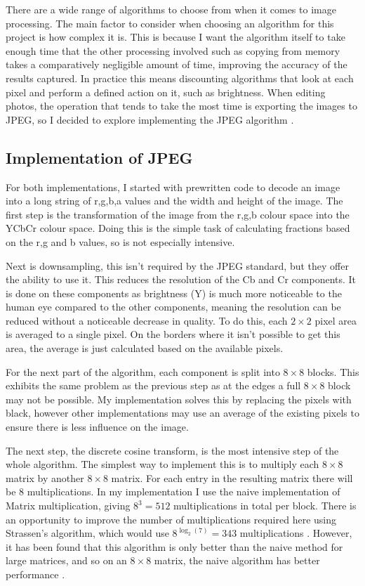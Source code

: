 \documentclass[12pt,a4paper]{article}
\begin{document}
There are a wide range of algorithms to choose from when it comes to image processing. The main factor to consider when choosing an algorithm for this project is how complex it is. This is because I want the algorithm itself to take enough time that the other processing involved such as copying from memory takes a comparatively negligible amount of time, improving the accuracy of the results captured. In practice this means discounting algorithms that look at each pixel and perform a defined action on it, such as brightness. When editing photos, the operation that tends to take the most time is exporting the images to JPEG, so I decided to explore implementing the JPEG algorithm \cite{jpeg}.

\subsection{Implementation of JPEG}

For both implementations, I started with prewritten code to decode an image into a long string of r,g,b,a values and the width and height of the image. The first step is the transformation of the image from the r,g,b colour space into the YCbCr colour space. Doing this is the simple task of calculating fractions based on the r,g and b values, so is not especially intensive.

Next is downsampling, this isn't required by the JPEG standard, but they offer the ability to use it. This reduces the resolution of the Cb and Cr components. It is done on these components as brightness (Y) is much more noticeable to the human eye compared to the other components, meaning the resolution can be reduced without a noticeable decrease in quality. To do this, each $2\times 2$ pixel area is averaged to a single pixel. On the borders where it isn't possible to get this area, the average is just calculated based on the available pixels.

For the next part of the algorithm, each component is split into $8\times 8$ blocks. This exhibits the same problem as the previous step as at the edges a full $8\times 8$ block may not be possible. My implementation solves this by replacing the pixels with black, however other implementations may use an average of the existing pixels to ensure there is less influence on the image.

The next step, the discrete cosine transform, is the most intensive step of the whole algorithm. The simplest way to implement this is to multiply each $8\times 8$ matrix by another $8\times 8$ matrix. For each entry in the resulting matrix there will be $8$ multiplications. In my implementation I use the naive implementation of Matrix multiplication, giving $8^3 = 512$ multiplications in total per block. There is an opportunity to improve the number of multiplications required here using Strassen's algorithm, which would use $8^{\log_2(7)}=343$ multiplications \cite{strassen1969gaussian}. However, it has been found that this algorithm is only better than the naive method for large matrices, and so on an $8\times 8$ matrix, the naive algorithm has better performance \cite{huang2016strassen}.
\end{document}
